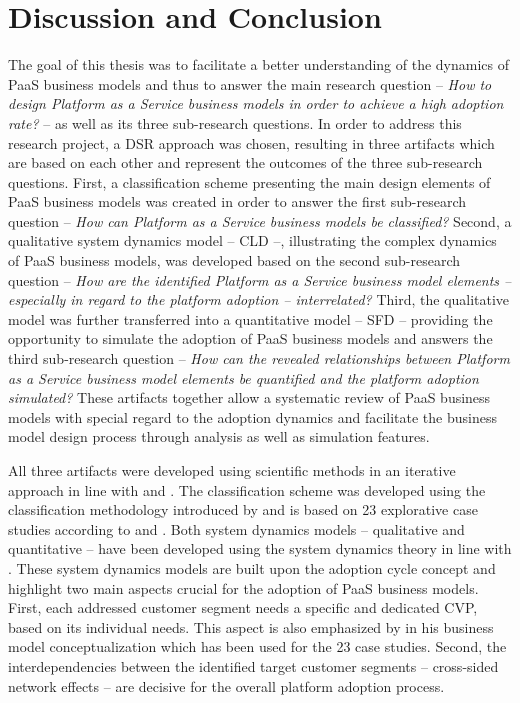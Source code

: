 \chapter{Discussion and Conclusion}\label{ch:dc}

The goal of this thesis was to facilitate a better understanding of the dynamics of \acf{PaaS} business models and thus to answer the main research question -- \textit{How to design Platform as a Service business models in order to achieve a high adoption rate?} -- as well as its three sub-research questions. In order to address this research project, a \acf{DSR} approach was chosen, resulting in three artifacts which are based on each other and represent the outcomes of the three sub-research questions. First, a classification scheme presenting the main design elements of \ac{PaaS} business models was created in order to answer the first sub-research question -- \textit{How can Platform as a Service business models be classified?} Second, a qualitative system dynamics model -- \acf{CLD} --, illustrating the complex dynamics of \ac{PaaS} business models, was developed based on the second sub-research question -- \textit{How are the identified Platform as a Service business model elements -- especially in regard to the platform adoption -- interrelated?} Third, the qualitative model was further transferred into a quantitative model -- \acf{SFD} -- providing the opportunity to simulate the adoption of \ac{PaaS} business models and answers the third sub-research question -- \textit{How can the revealed relationships between Platform as a Service business model elements be quantified and the platform adoption simulated?} These artifacts together allow a systematic review of \ac{PaaS} business models with special regard to the adoption dynamics and facilitate the business model design process through analysis as well as simulation features. 

All three artifacts were developed using scientific methods in an iterative approach in line with \citet{Hevner2007} and \citet{Peffers2007}. The classification scheme was developed using the classification methodology introduced by \citet{Fettke2003} and is based on 23 explorative case studies according to \citet{Eisenhardt1989} and \citet{Yin2008}. Both system dynamics models -- qualitative and quantitative -- have been developed using the system dynamics theory in line with \citet{Sterman2000,Sterman2001}. These system dynamics models are built upon the adoption cycle concept \citep{Sterman2001} and highlight two main aspects crucial for the adoption of \ac{PaaS} business models. First, each addressed customer segment needs a specific and dedicated \acf{CVP}, based on its individual needs. This aspect is also emphasized by \citet{Johnson2008} in his business model conceptualization which has been used for the 23 case studies. Second, the interdependencies between the identified target customer segments -- cross-sided network effects -- are decisive for the overall platform adoption process.

